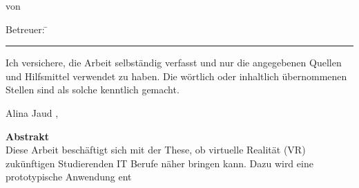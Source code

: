 \begin{titlepage}
{\begin{flushleft}
	\vspace{2cm}\hspace*{-1.7cm}						%
	\parbox[t][3cm][t]{13.5cm}
		{
			\LARGE	
			\centerline{\doctype}
			\centerline{von}
			\centerline{\bfseries\docauthor}
		} 		
\end{flushleft}
	\ifthenelse{\equal{\betreuerII}{}}
	{
		\vspace*{2cm}\hspace*{-1.7cm}
	}
	{
		\vspace*{2cm}\vspace*{-\baselineskip}\hspace*{-1.7cm}
	}
	\parbox[t][1cm][t]{13.5cm}
	{
		\ifthenelse{\equal{\betreuerII}{}}
		{
		}
		{
		\begin{tabbing}
			\Large\sffamily Betreuer: \= \Large\sffamily\bfseries\betreuerI\\
			\> \Large\sffamily\bfseries\betreuerII
		\end{tabbing}
		\vspace*{-\baselineskip}
		}
		\vspace*{0.5cm}
		\hrule
		\vspace*{0.5cm}
		\leftline{\Large\sffamily \monthword{\month}~\the\year}																		
	}
}
\cleardoublepage

\pagestyle{empty}
\vspace*{0.1cm}
Ich versichere, die Arbeit selbständig verfasst und nur die angegebenen Quellen und Hilfsmittel verwendet zu haben. Die wörtlich oder inhaltlich übernommenen Stellen sind als solche kenntlich gemacht. 
\vspace*{3cm}
\begin{center}
Alina Jaud \doclocation, \docdate
\end{center}
\cleardoublepage

\newpage
\textbf{Abstrakt}\\
Diese Arbeit beschäftigt sich mit der These, ob virtuelle Realität (VR) zukünftigen Studierenden IT Berufe näher bringen kann. Dazu wird eine prototypische Anwendung ent
\end{titlepage}
